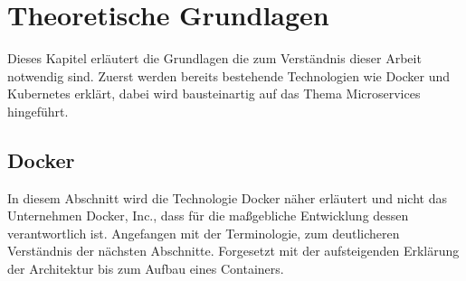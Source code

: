 \chapter{Theoretische Grundlagen}
Dieses Kapitel erläutert die Grundlagen die zum 
Verständnis dieser Arbeit notwendig sind. Zuerst werden bereits bestehende Technologien wie 
Docker und Kubernetes erklärt, dabei wird bausteinartig auf das Thema Microservices hingeführt.


\section{Docker}

In diesem Abschnitt wird die Technologie \glqq Docker\grqq{} näher erläutert und
nicht das Unternehmen \glqq Docker, Inc.\grqq{}, dass für die maßgebliche Entwicklung dessen verantwortlich ist.
Angefangen mit der Terminologie, zum deutlicheren Verständnis der nächsten Abschnitte.
Forgesetzt mit der aufsteigenden Erklärung der Architektur bis zum Aufbau eines Containers.


